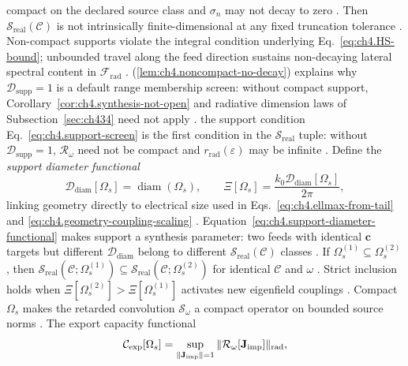 compact on the declared source class and \(\sigma_{n}\) may not decay to zero \cite{stratton1941}. Then
\(\mathcal{S}_{\mathrm{real}}(\mathcal{C})\) is not intrinsically finite-dimensional at any fixed truncation tolerance
\cite{harrington2001}.
Non-compact supports violate the integral condition underlying Eq.~\eqref{eq:ch4.HS-bound}; unbounded travel along the
feed direction sustains non-decaying lateral spectral content in \(\mathcal{F}_{\mathrm{rad}}\) \cite{jackson1999}.
(\ref{lem:ch4.noncompact-no-decay}) explains why \(\mathcal{D}_{\mathrm{supp}}=1\) is a default range membership
screen: without compact support, Corollary~\ref{cor:ch4.synthesis-not-open} and radiative dimension laws of
Subsection~\ref{sec:ch434} need not apply \cite{stratton1941}.
the support condition Eq.~\eqref{eq:ch4.support-screen} is the first condition in the $\mathcal{S}_{\mathrm{real}}$ tuple: without
\(\mathcal{D}_{\mathrm{supp}}=1\), \(\mathcal{R}_\omega\) need not be compact and \(r_{\mathrm{rad}}(\varepsilon)\) may
be infinite \cite{stratton1941}. Define the \emph{support diameter functional}
\begin{equation}
\label{eq:ch4.support-diameter-functional}
\mathcal{D}_{\mathrm{diam}}[\Omega_{s}]
=
\operatorname{diam}(\Omega_{s}),
\qquad
\Xi[\Omega_{s}]
=
\frac{k_{0}\mathcal{D}_{\mathrm{diam}}[\Omega_{s}]}{2\pi},
\end{equation}
linking geometry directly to electrical size used in Eqs.~\eqref{eq:ch4.ellmax-from-tail} and
\eqref{eq:ch4.geometry-coupling-scaling} \cite{hansen1988}. Equation~\eqref{eq:ch4.support-diameter-functional}
makes support a synthesis parameter: two feeds with identical \(\mathbf{c}\) targets but different
\(\mathcal{D}_{\mathrm{diam}}\) belong to different \(\mathcal{S}_{\mathrm{real}}(\mathcal{C})\) classes
\cite{devaney2004}.
\label{prop:ch4.nested-support-synthesis}
If \(\Omega_{s}^{(1)}\subseteq\Omega_{s}^{(2)}\), then
\(\mathcal{S}_{\mathrm{real}}(\mathcal{C};\Omega_{s}^{(1)})\subseteq\mathcal{S}_{\mathrm{real}}(\mathcal{C};\Omega_{s}^{(2)})\)
for identical \(\mathcal{C}\) and \(\omega\) \cite{stratton1941}. Strict inclusion holds when
\(\Xi[\Omega_{s}^{(2)}]>\Xi[\Omega_{s}^{(1)}]\) activates new eigenfield couplings
\cite{jackson1999}.
Compact \(\Omega_{s}\) makes the retarded convolution \(\mathcal{S}_\omega\) a compact operator on bounded source
norms \cite{stratton1941}. The export capacity functional
\begin{equation}
\label{eq:ch4.export-capacity-functional}
\mathcal{C}_{\mathrm{exp}}[\Omega_{s}]
=
\sup_{\|\mathbf{J}_{\mathrm{imp}}\|=1}
\|\mathcal{R}_\omega[\mathbf{J}_{\mathrm{imp}}]\|_{\mathrm{rad}},
\end{equation}
